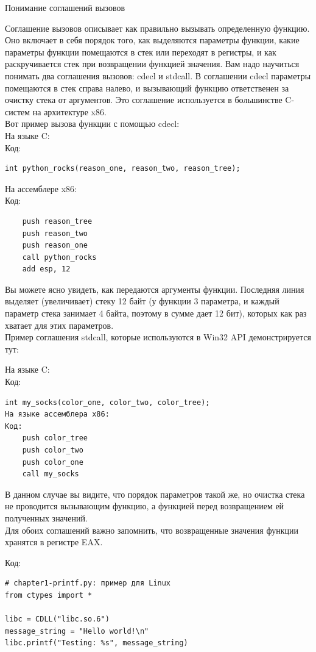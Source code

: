 \documentclass[12pt, a4paper, oneside]{book}
\begin{document}
\begin{bclogo}{Понимание соглашений вызовов}

Соглашение вызовов описывает как правильно вызывать определенную функцию. Оно включает в себя порядок того, как выделяются параметры функции, какие параметры функции помещаются в стек или переходят в регистры, и как раскручивается стек при возвращении функцией значения. Вам надо научиться понимать два соглашения вызовов: cdecl и stdcall. В соглашении cdecl параметры помещаются в стек справа налево, и вызывающий функцию ответственен за очистку стека от аргументов. Это соглашение используется в большинстве C-систем на архитектуре x86.\\

Вот пример вызова функции с помощью cdecl:\\

На языке C:\\
Код:
\begin{verbatim}
int python_rocks(reason_one, reason_two, reason_tree);
\end{verbatim}
На ассемблере x86:\\
Код:
\begin{verbatim}
    push reason_tree
    push reason_two
    push reason_one
    call python_rocks
    add esp, 12
\end{verbatim}
Вы можете ясно увидеть, как передаются аргументы функции. Последняя линия выделяет (увеличивает) стеку 12 байт (у функции 3 параметра, и каждый параметр стека занимает 4 байта, поэтому в сумме дает 12 бит), которых как раз хватает для этих параметров.\\

Пример соглашения stdcall, которые используются в Win32 API демонстрируется тут:

На языке C:\\
Код:
\begin{verbatim}
int my_socks(color_one, color_two, color_tree);
На языке ассемблера x86:
Код:
    push color_tree
    push color_two
    push color_one
    call my_socks
\end{verbatim}
В данном случае вы видите, что порядок параметров такой же, но очистка стека не проводится вызывающим функцию, а функцией перед возвращением ей полученных значений.\\

Для обоих соглашений важно запомнить, что возвращенные значения функции хранятся в регистре EAX.
\end{bclogo}
Код:
\begin{verbatim}
# chapter1-printf.py: пример для Linux
from ctypes import *

libc = CDLL("libc.so.6")
message_string = "Hello world!\n"
libc.printf("Testing: %s", message_string)
\end{verbatim}
\end{document}
